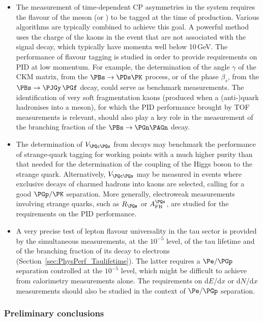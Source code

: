 \begin{itemize}

\item The measurement of time-dependent CP asymmetries in the \PBs system requires the flavour of the meson (\PBs or \PABs) to be tagged at the time of production. 
Various algorithms are typically combined to achieve this goal. 
A powerful method uses the charge of the kaons in the event that are not associated with the signal decay, which typically have momenta well below 10\,GeV.
The performance of flavour tagging is studied in order to provide requirements on PID at low momentum. 
For example, the determination of the angle $\gamma$ of the CKM matrix, from the $\PBs \to \PDs \PK$ process, 
or of the phase $\beta_s$, from the $\PBs \to \PJGy \, \PGf$ decay, could serve as benchmark measurements. 
The identification of very soft fragmentation kaons (produced when a \PQb (anti-)quark hadronises into a \PBs meson), 
for which the PID performance brought by TOF measurements is relevant, 
should also play a key role in the measurement of the branching fraction of the $\PBs \to \PGn \PAGn$ decay.

\item The determination of $V_{\PQc\PQs}$ from \PW decays may benchmark the performance of strange-quark tagging 
for working points with a much higher purity than that needed for the determination of the coupling of the Higgs boson to the strange quark. 
Alternatively, $V_{\PQc\PQs}$ may be measured in events where exclusive decays of charmed hadrons into kaons are selected, calling for a good $\PGp/\PK$ separation. 
More generally, electroweak measurements involving strange quarks, such as $R_{\PQs}$ or $A_\text{FB}^{\PQs}$, are studied for the requirements on the PID performance.

\item A very precise test of lepton flavour universality in the tau sector is provided by the simultaneous measurements, at the $10^{-5}$ level, 
of the tau lifetime and of the branching fraction of its decay to electrons (Section~\ref{sec:PhysPerf_Taulifetime}). 
The latter requires a $\Pe / \PGp$ separation controlled at the $10^{-5}$ level, 
which might be difficult to achieve from calorimetry measurements alone. 
The requirements on d$E$/d$x$ or d$N$/d$x$ measurements should also be studied in the context of $\Pe / \PGp$ separation.

\end{itemize}

\subsubsection{Preliminary conclusions}

